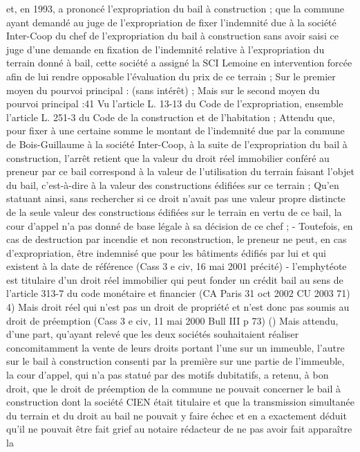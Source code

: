 \documentclass[11pt,a4paper]{report}
\begin{document}
	et, en 1993, a prononcé l'expropriation du bail à construction ; que la commune ayant demandé au juge de
	l'expropriation de fixer l'indemnité due à la société Inter-Coop du chef de l'expropriation du bail à construction
	sans avoir saisi ce juge d'une demande en fixation de l'indemnité relative à l'expropriation du terrain donné à
	bail, cette société a assigné la SCI Lemoine en intervention forcée afin de lui rendre opposable l'évaluation du
	prix de ce terrain ;
	Sur le premier moyen du pourvoi principal : (sans intérêt) ;
	Mais sur le second moyen du pourvoi principal :41
	Vu l'article L. 13-13 du Code de l'expropriation, ensemble l'article L. 251-3 du Code de la construction et de
	l'habitation ;
	Attendu que, pour fixer à une certaine somme le montant de l'indemnité due par la commune de Bois-Guillaume
	à la société Inter-Coop, à la suite de l'expropriation du bail à construction, l'arrêt retient que la valeur du droit
	réel immobilier conféré au preneur par ce bail correspond à la valeur de l'utilisation du terrain faisant l'objet du
	bail, c'est-à-dire à la valeur des constructions édifiées sur ce terrain ;
	Qu'en statuant ainsi, sans rechercher si ce droit n'avait pas une valeur propre distincte de la seule valeur des
	constructions édifiées sur le terrain en vertu de ce bail, la cour d'appel n'a pas donné de base légale à sa
	décision de ce chef ;
	- Toutefois, en cas de destruction par incendie et non reconstruction, le preneur ne peut, en cas d’expropriation,
	être indemnisé que pour les bâtiments édifiés par lui et qui existent à la date de référence (Cass 3 e civ, 16 mai
	2001 précité)
	- l’emphytéote est titulaire d’un droit réel immobilier qui peut fonder un crédit bail au sens de l’article 313-7 du
	code monétaire et financier (CA Paris 31 oct 2002 CU 2003 71)
	4) Mais droit réel qui n’est pas un droit de propriété et n’est donc pas soumis au droit de préemption
	(Cass 3 e civ, 11 mai 2000 Bull III  p 73) ()
	Mais attendu, d'une part, qu'ayant relevé que les deux sociétés souhaitaient réaliser concomitamment la vente de
	leurs droits portant l'une sur un immeuble, l'autre sur le bail à construction consenti par la première sur une
	partie de l'immeuble, la cour d'appel, qui n'a pas statué par des motifs dubitatifs, a retenu, à bon droit, que le
	droit de préemption de la commune ne pouvait concerner le bail à construction dont la société CIEN était
	titulaire et que la transmission simultanée du terrain et du droit au bail ne pouvait y faire échec et en a
	exactement déduit qu'il ne pouvait être fait grief au notaire rédacteur de ne pas avoir fait apparaître la
\end{document}

